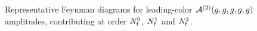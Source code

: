 \begin{figure}[ht]
  \begin{center}
\end{center} 
\caption{Representative Feynman diagrams for leading-color
$\mathcal{A}^{(2)}(g,g,g,g,g)$ amplitudes, contributing at order
$N_\mathrm{f}^0$, $N_\mathrm{f}^1$ and $N_\mathrm{f}^2$.}
\label{fig_parents5g}
\end{figure}

